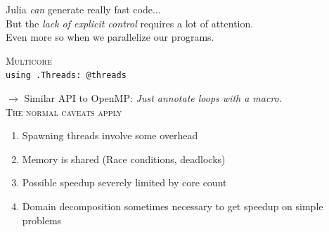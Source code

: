 \documentclass[14pt]{beamer}
\def\MyBlue{NavyBlue}
\begin{document}
\begin{frame}
    \centering\scriptsize
    Julia {\em can} generate really fast code...\\[1em]
    
    \pause
    But the {\em \color{orange}lack of explicit control} 
        requires a lot of attention.\\[4em]

    \pause
    Even more so when we
    {\color{\MyBlue}parallelize} our programs.
\end{frame}


\begin{frame}
    \centering
    \textsc{Multicore}\\[1em]

    \texttt{using .Threads: @threads}
\end{frame}


\begin{frame}
    \centering
    {
    \begin{minipage}[c][.8\textheight][c]{\textwidth}
        \centering
        {
        } $\longrightarrow$
        {
        }
        \scriptsize
        Similar API to OpenMP: {\em Just annotate loops with a
        macro.}\\[2em]

        \pause
        \textsc{The normal caveats apply}
        \begin{enumerate}
            \item Spawning threads involve some overhead
            \item \pause Memory is shared (Race conditions,
                deadlocks)
            \item \pause Possible speedup severely limited
                by core count
            \item \pause Domain decomposition sometimes
                necessary to get speedup on simple problems
        \end{enumerate}
    \end{minipage}
    }
\end{frame}
\end{document}
